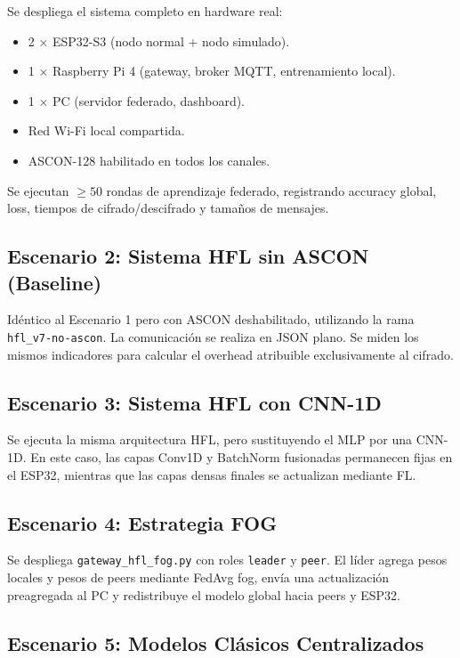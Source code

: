 Se despliega el sistema completo en hardware real:
\begin{itemize}
    \item 2 × ESP32-S3 (nodo normal + nodo simulado).
    \item 1 × Raspberry Pi 4 (gateway, broker MQTT, entrenamiento local).
    \item 1 × PC (servidor federado, dashboard).
    \item Red Wi-Fi local compartida.
    \item ASCON-128 habilitado en todos los canales.
\end{itemize}

Se ejecutan $\geq 50$ rondas de aprendizaje federado, registrando accuracy global, loss, tiempos de cifrado/descifrado y tamaños de mensajes.

\subsection{Escenario 2: Sistema HFL sin ASCON (Baseline)}

Idéntico al Escenario 1 pero con ASCON deshabilitado, utilizando la rama \texttt{hfl\_v7-no-ascon}. La comunicación se realiza en JSON plano. Se miden los mismos indicadores para calcular el overhead atribuible exclusivamente al cifrado.

\subsection{Escenario 3: Sistema HFL con CNN-1D}

Se ejecuta la misma arquitectura HFL, pero sustituyendo el MLP por una CNN-1D. En este caso, las capas Conv1D y BatchNorm fusionadas permanecen fijas en el ESP32, mientras que las capas densas finales se actualizan mediante FL.

\subsection{Escenario 4: Estrategia FOG}

Se despliega \texttt{gateway\_hfl\_fog.py} con roles \texttt{leader} y \texttt{peer}. El líder agrega pesos locales y pesos de peers mediante FedAvg fog, envía una actualización preagregada al PC y redistribuye el modelo global hacia peers y ESP32.

\subsection{Escenario 5: Modelos Clásicos Centralizados}

